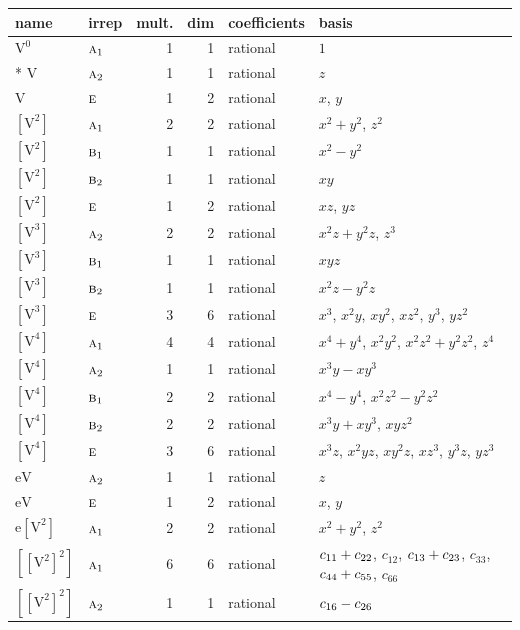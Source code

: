 \documentclass[10pt,a4paper]{article}
\numberwithin{equation}{section}
\newcommand{\irr}[1]{\text{\normalfont\scshape #1}}
\newcommand{\jahn}[1]{\mathrm{#1}}
\newlength{\fillwidth}\newlength{\cellwidth}\newlength{\colwidth}
\newcommand{\signbreak}{\penalty100\relax}
\begin{document}
{\begin{longtable}{@{}llrrl>{\RaggedRight\arraybackslash}p{\fillwidth}@{}}
name & irrep & mult. & dim & coefficients & basis\\\midrule\endhead
\bottomrule\endfoot\endlastfoot
$\jahn{V^{0}}$ & $\irr{a}_{1}$ & 1 & 1 & rational & $1$\\*
$\jahn{V}$ & $\irr{a}_{2}$ & 1 & 1 & rational & $z$\\
$\jahn{V}$ & $\irr{e}$ & 1 & 2 & rational & $x$, $y$\\
$\jahn{[V^{2}]}$ & $\irr{a}_{1}$ & 2 & 2 & rational & $x^{2} + y^{2}$, $z^{2}$\\
$\jahn{[V^{2}]}$ & $\irr{b}_{1}$ & 1 & 1 & rational & $x^{2} - y^{2}$\\
$\jahn{[V^{2}]}$ & $\irr{b}_{2}$ & 1 & 1 & rational & $xy$\\
$\jahn{[V^{2}]}$ & $\irr{e}$ & 1 & 2 & rational & $xz$, $yz$\\
$\jahn{[V^{3}]}$ & $\irr{a}_{2}$ & 2 & 2 & rational & $x^{2}z + y^{2}z$, $z^{3}$\\
$\jahn{[V^{3}]}$ & $\irr{b}_{1}$ & 1 & 1 & rational & $xyz$\\
$\jahn{[V^{3}]}$ & $\irr{b}_{2}$ & 1 & 1 & rational & $x^{2}z - y^{2}z$\\
$\jahn{[V^{3}]}$ & $\irr{e}$ & 3 & 6 & rational & $x^{3}$, $x^{2}y$, $xy^{2}$, $xz^{2}$, $y^{3}$, $yz^{2}$\\
$\jahn{[V^{4}]}$ & $\irr{a}_{1}$ & 4 & 4 & rational & $x^{4} + y^{4}$, $x^{2}y^{2}$, $x^{2}z^{2} + y^{2}z^{2}$, $z^{4}$\\
$\jahn{[V^{4}]}$ & $\irr{a}_{2}$ & 1 & 1 & rational & $x^{3}y - xy^{3}$\\
$\jahn{[V^{4}]}$ & $\irr{b}_{1}$ & 2 & 2 & rational & $x^{4} - y^{4}$, $x^{2}z^{2} - y^{2}z^{2}$\\
$\jahn{[V^{4}]}$ & $\irr{b}_{2}$ & 2 & 2 & rational & $x^{3}y + xy^{3}$, $xyz^{2}$\\
$\jahn{[V^{4}]}$ & $\irr{e}$ & 3 & 6 & rational & $x^{3}z$, $x^{2}yz$, $xy^{2}z$, $xz^{3}$, $y^{3}z$, $yz^{3}$\\
$\jahn{eV}$ & $\irr{a}_{2}$ & 1 & 1 & rational & $z$\\
$\jahn{eV}$ & $\irr{e}$ & 1 & 2 & rational & $x$, $y$\\
$\jahn{e[V^{2}]}$ & $\irr{a}_{1}$ & 2 & 2 & rational & $x^{2} + y^{2}$, $z^{2}$\\
$\jahn{[[V^{2}]^{2}]}$ & $\irr{a}_{1}$ & 6 & 6 & rational & $c_{11} +\signbreak c_{22}$, $c_{12}$, $c_{13} +\signbreak c_{23}$, $c_{33}$, $c_{44} +\signbreak c_{55}$, $c_{66}$\\
$\jahn{[[V^{2}]^{2}]}$ & $\irr{a}_{2}$ & 1 & 1 & rational & $c_{16} -\signbreak c_{26}$\\

\end{longtable}}
\end{document}
